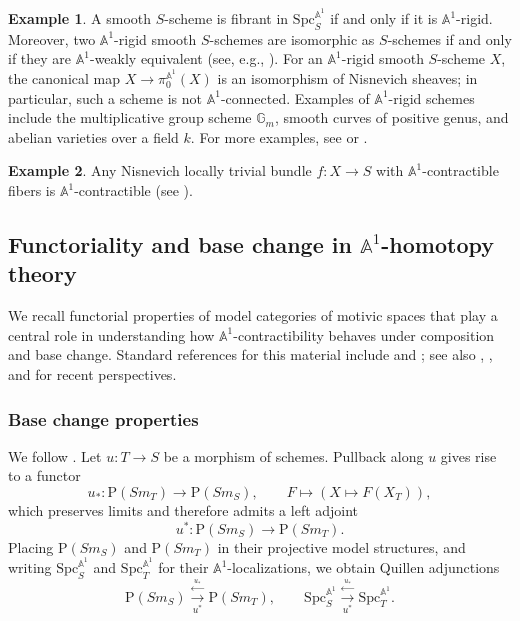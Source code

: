 \documentclass[10pt]{amsart}
\renewcommand{\AA}{\mathbb{A}}
\numberwithin{equation}{section} %
\theoremstyle{plain}
\theoremstyle{definition}
\newtheorem{example}[example]{Example}
\theoremstyle{remark}
\begin{document}
\begin{example}
A smooth $S$-scheme is fibrant in $\mathrm{Spc}_S^{\AA^1}$ if and only if it is $\AA^1$-rigid. 
Moreover, two $\AA^1$-rigid smooth $S$-schemes are isomorphic as $S$-schemes 
if and only if they are $\AA^1$-weakly equivalent 
(see, e.g., \cite[Lemma~4.1.8 and Corollary~4.1.9]{asok2021A1}).  
For an $\AA^1$-rigid smooth $S$-scheme $X$, the canonical map 
$X \to \pi_0^{\AA^1}(X)$ is an isomorphism of Nisnevich sheaves; 
in particular, such a scheme is not $\AA^1$-connected.  
Examples of $\AA^1$-rigid schemes include the multiplicative group scheme $\mathbb{G}_m$, 
smooth curves of positive genus, and abelian varieties over a field $k$. 
For more examples, see \cite[\S 2]{AM11} or \cite[\S 2.2]{choudhury2024}.
\end{example}

\begin{example}\label{eg:A1-contractibles}
Any Nisnevich locally trivial bundle $f \colon X \to S$
with $\AA^1$-contractible fibers is $\AA^1$-contractible 
(see \cite[Examples~2.3 and~2.4]{MV99}).
\end{example}


\subsection{Functoriality and base change in \texorpdfstring{$\AA^1$}{A1}-homotopy theory}
We recall functorial properties of model categories of motivic spaces that play a central role in understanding how $\AA^1$-contractibility behaves under composition and base change. Standard references for this material include \cite{Ayoub2007six, CD2019} and \cite[\S3]{MV99}; see also \cite[\S4]{hoyois2017six}, \cite[\S2]{zbMATH07566080}, and \cite{bachmann2024stronglya1} for recent perspectives.

\subsubsection{Base change properties}

We follow \cite[Section~3]{oropenbook}.  
Let $u:T\to S$ be a morphism of schemes.  
Pullback along $u$ gives rise to a functor
\[
u_*:\mathrm{P}(Sm_T)\to  \mathrm{P}(Sm_S),\qquad
F\longmapsto (X\longmapsto F(X_T)),
\]
which preserves limits and therefore admits a left adjoint
\[
u^*:\mathrm{P}(Sm_S)\to  \mathrm{P}(Sm_T).
\]
Placing $\mathrm{P}(Sm_S)$ and $\mathrm{P}(Sm_T)$ in their projective model structures, and writing $\mathrm{Spc}_S^{\AA^1}$ and $\mathrm{Spc}_T^{\AA^1}$ for their $\AA^1$-localizations, we obtain Quillen adjunctions
\begin{equation}
\mathrm{P}(Sm_S)
  \stackrel{\overset{u_*}{\longleftarrow}}{\underset{u^*}{\rightarrow}}
\mathrm{P}(Sm_T),
\qquad
\mathrm{Spc}_S^{\AA^1}
  \stackrel{\overset{u_*}{\longleftarrow}}{\underset{u^*}{\rightarrow}}
\mathrm{Spc}_T^{\AA^1}.
\end{equation}
\end{document}
